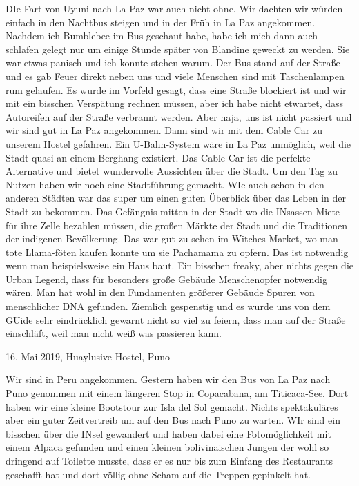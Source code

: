 \documentclass[11pt]{book}
\begin{document}
DIe Fart von Uyuni nach La Paz war auch nicht ohne. Wir dachten wir würden einfach in den Nachtbus steigen und in der Früh in La Paz angekommen. Nachdem 
ich Bumblebee im Bus geschaut habe, habe ich mich dann auch schlafen gelegt nur um einige Stunde später von Blandine geweckt zu werden. Sie war etwas 
panisch und ich konnte stehen warum. Der Bus stand auf der Straße und es gab Feuer direkt neben uns und viele Menschen sind mit Taschenlampen rum gelaufen. 
Es wurde im Vorfeld gesagt, dass eine Straße blockiert ist und wir mit ein bisschen Verspätung rechnen müssen, aber ich habe nicht etwartet, dass Autoreifen 
auf der Straße verbrannt werden. Aber naja, uns ist nicht passiert und wir sind gut in La Paz angekommen. Dann sind wir mit dem Cable Car zu unserem Hostel 
gefahren. Ein U-Bahn-System wäre in La Paz unmöglich, weil die Stadt quasi an einem Berghang existiert. Das Cable Car ist die perfekte Alternative und 
bietet wundervolle Aussichten über die Stadt. Um den Tag zu Nutzen haben wir noch eine Stadtführung gemacht. WIe auch schon in den anderen Städten 
war das super um einen guten Überblick über das Leben in der Stadt zu bekommen. Das Gefängnis mitten in der Stadt wo die INsassen Miete für ihre Zelle 
bezahlen müssen, die großen Märkte der Stadt und die Traditionen der indigenen Bevölkerung. Das war gut zu sehen im Witches Market, wo man tote 
Llama-föten kaufen konnte um sie Pachamama zu opfern. Das ist notwendig wenn man beispielsweise ein Haus baut. Ein bisschen freaky, aber nichts gegen 
die Urban Legend, dass für besonders große Gebäude Menschenopfer notwendig wären. Man hat wohl in den Fundamenten größerer Gebäude Spuren von menschlicher 
DNA gefunden. Ziemlich gespenstig und es wurde uns von dem GUide sehr eindrücklich gewarnt nicht so viel zu feiern, dass man auf der Straße einschläft, 
weil man nicht weiß was passieren kann. 


16. Mai 2019, Huaylusive Hostel, Puno

Wir sind in Peru angekommen. Gestern haben wir den Bus von La Paz nach Puno genommen mit einem längeren Stop in Copacabana, am Titicaca-See. Dort haben 
wir eine kleine Bootstour zur Isla del Sol gemacht. Nichts spektakuläres aber ein guter Zeitvertreib um auf den Bus nach Puno zu warten. WIr sind ein 
bisschen über die INsel gewandert und haben dabei eine Fotomöglichkeit mit einem Alpaca gefunden und einen kleinen bolivinaischen Jungen der wohl so dringend 
auf Toilette musste, dass er es nur bis zum Einfang des Restaurants geschafft hat und dort völlig ohne Scham auf die Treppen gepinkelt hat. 
\end{document}
